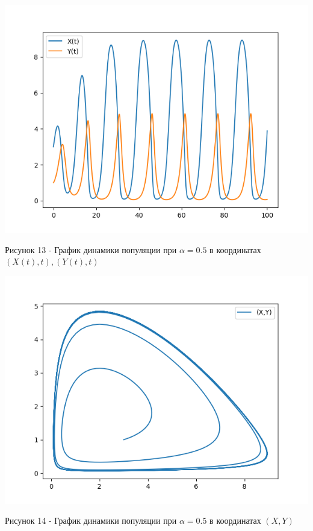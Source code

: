 \documentclass[a4paper,14pt]{extreport}
\begin{document}
\begin{center}
    \begin{minipage}[htb]{0.8\linewidth}
    \includegraphics[width=14cm]{n9.png}
    \end{minipage}
    \end{center}
    \begin{center}
        Рисунок 13 - График динамики популяции при $\alpha = 0.5$ в координатах $(X(t),t),(Y(t),t)$
    \end{center}
    \begin{center}
    \begin{minipage}[htb]{0.8\linewidth}
    \includegraphics[width=14cm]{9.png}
    \end{minipage}
    \end{center}
    \begin{center}
        Рисунок 14 - График динамики популяции при $\alpha = 0.5$ в координатах $(X,Y)$  
    \end{center}
\end{document}
